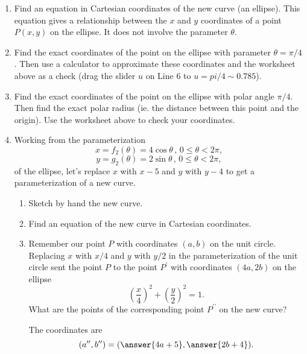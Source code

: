\documentclass{ximera}
\begin{document}
\begin{example}
\begin{enumerate}
\item Find an equation in Cartesian coordinates of the new curve (an ellipse). This equation gives a relationship between the $x$ and $y$ coordinates of a point $P(x,y)$ on the ellipse. It does not involve the parameter $\theta$.

\item Find the exact coordinates of the point on the ellipse with parameter $\theta=\pi/4$. Then use a calculator to approximate these coordinates and the worksheet above as a check (drag the slider $u$ on Line 6 to $u=pi/4 \sim 0.785$).

\item Find the exact coordinates of the point on the ellipse with polar angle $\pi/4$. Then find the exact polar radius (ie. the distance between this point and the origin). Use the worksheet above to check your coordinates.

\item Working from the parameterization 
\[ 
     x = f_2 (\theta) = 4\cos\theta \, , \, 0\leq \theta <2\pi ,
\]
\[
   y = g_2 (\theta) = 2\sin\theta \, , \, 0\leq \theta <2\pi ,
\]
of the ellipse, let's replace $x$ with $x-5$ and $y$ with $y-4$ to get a parameterization of a new curve.

\begin{enumerate}
\item Sketch by hand the new curve.

\item Find an equation of the new curve in Cartesian coordinates.

\item Remember our point $P$ with coordinates $(a,b)$ on the unit circle. Replacing $x$ with $x/4$ and $y$ with $y/2$ in the parameterization of the unit circle sent the point $P$ to the point $P^\prime$ with coordinates $(4a, 2b)$ on the ellipse
\[
  \left( \frac{x}{4} \right)^2 + \left( \frac{y}{2} \right)^2 = 1.
\]
What are the points of the corresponding point $P^{\prime\prime}$ on the new curve?

The coordinates are 
\[
   (a^{\prime\prime} , b^{\prime\prime}) = (\answer{4a+5} , \answer{2b+4} ) .
\]


\end{enumerate}

\end{enumerate}
\end{example}
\end{document}
